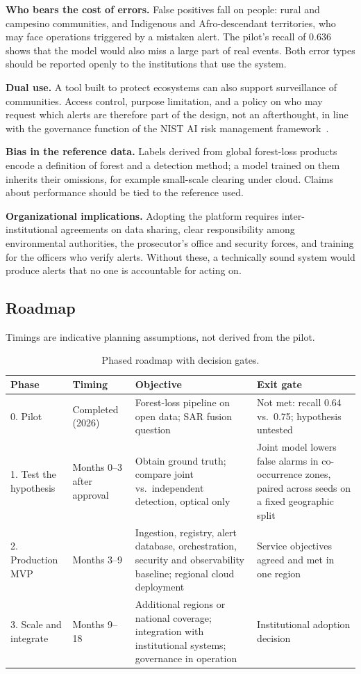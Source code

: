 \documentclass{article}
\begin{document}
\textbf{Who bears the cost of errors.} False positives fall on people: rural and
campesino communities, and Indigenous and Afro-descendant territories, who may
face operations triggered by a mistaken alert. The pilot's recall of 0.636 shows
that the model would also miss a large part of real events. Both error types
should be reported openly to the institutions that use the system.

\textbf{Dual use.} A tool built to protect ecosystems can also support
surveillance of communities. Access control, purpose limitation, and a policy on
who may request which alerts are therefore part of the design, not an
afterthought, in line with the governance function of the NIST AI risk
management framework~\cite{nistairmf2023}.

\textbf{Bias in the reference data.} Labels derived from global forest-loss
products encode a definition of forest and a detection method; a model trained on
them inherits their omissions, for example small-scale clearing under cloud.
Claims about performance should be tied to the reference used.

\textbf{Organizational implications.} Adopting the platform requires
inter-institutional agreements on data sharing, clear responsibility among
environmental authorities, the prosecutor's office and security forces, and
training for the officers who verify alerts. Without these, a technically sound
system would produce alerts that no one is accountable for acting on.
\subsection{Roadmap}
\label{sec:roadmap}

Timings are indicative planning assumptions, not derived from the pilot.

\begin{table}[H]
\centering
\caption{Phased roadmap with decision gates.}
\label{tab:roadmap}
\small
\begin{tabular}{p{1.8cm}p{1.9cm}p{4.2cm}p{4.0cm}}
\toprule
Phase & Timing & Objective & Exit gate \\
\midrule
0. Pilot & Completed (2026) & Forest-loss pipeline on open data; SAR fusion question & Not met: recall 0.64 vs.\ 0.75; hypothesis untested \\
1. Test the hypothesis & Months 0--3 after approval & Obtain ground truth; compare joint vs.\ independent detection, optical only & Joint model lowers false alarms in co-occurrence zones, paired across seeds on a fixed geographic split \\
2. Production MVP & Months 3--9 & Ingestion, registry, alert database, orchestration, security and observability baseline; regional cloud deployment & Service objectives agreed and met in one region \\
3. Scale and integrate & Months 9--18 & Additional regions or national coverage; integration with institutional systems; governance in operation & Institutional adoption decision \\
\bottomrule
\end{tabular}
\end{table}
\end{document}
